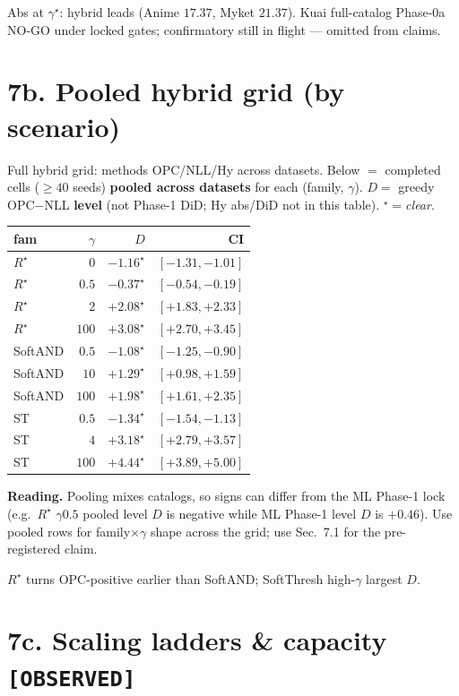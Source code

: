 \documentclass[11pt]{article}
\newcommand{\phonesection}[1]{\Needspace{8\baselineskip}\section*{#1}}
\newcommand{\stag}[1]{\texttt{[#1]}}
\newcommand{\Rstar}{R^{\star}}
\begin{document}
Abs at $\gamma^{\star}$: hybrid leads
(Anime $17.37$, Myket $21.37$).
Kuai full-catalog Phase-0a NO-GO under
locked gates; confirmatory still in flight
--- omitted from claims.

\phonesection{7b. Pooled hybrid grid
(by scenario)}

Full hybrid grid: methods OPC/NLL/Hy across
datasets. Below $=$ completed cells
($\ge 40$ seeds) \textbf{pooled across
datasets} for each (family, $\gamma$).
$D=$ greedy OPC$-$NLL \textbf{level}
(not Phase-1 DiD; Hy abs/DiD not in this
table). $^{\star}=$\emph{clear}.

{\scriptsize
\begin{tabular}{@{}l r r r@{}}
\toprule
fam & $\gamma$ & $D$ & CI \\
\midrule
$\Rstar$ & $0$ & $-1.16^{\star}$ & $[-1.31,-1.01]$ \\
$\Rstar$ & $0.5$ & $-0.37^{\star}$ & $[-0.54,-0.19]$ \\
$\Rstar$ & $2$ & $+2.08^{\star}$ & $[+1.83,+2.33]$ \\
$\Rstar$ & $100$ & $+3.08^{\star}$ & $[+2.70,+3.45]$ \\
SoftAND & $0.5$ & $-1.08^{\star}$ & $[-1.25,-0.90]$ \\
SoftAND & $10$ & $+1.29^{\star}$ & $[+0.98,+1.59]$ \\
SoftAND & $100$ & $+1.98^{\star}$ & $[+1.61,+2.35]$ \\
ST & $0.5$ & $-1.34^{\star}$ & $[-1.54,-1.13]$ \\
ST & $4$ & $+3.18^{\star}$ & $[+2.79,+3.57]$ \\
ST & $100$ & $+4.44^{\star}$ & $[+3.89,+5.00]$ \\
\bottomrule
\end{tabular}}

\textbf{Reading.} Pooling mixes catalogs, so
signs can differ from the ML Phase-1 lock
(e.g.\ $\Rstar$ $\gamma0.5$ pooled level $D$
is negative while ML Phase-1 level $D$ is
$+0.46$). Use pooled rows for
family$\times\gamma$ shape across the grid;
use Sec.~7.1 for the pre-registered claim.

$\Rstar$ turns OPC-positive earlier than
SoftAND; SoftThresh high-$\gamma$ largest $D$.

\phonesection{7c. Scaling ladders \& capacity
\stag{OBSERVED}}
\end{document}

